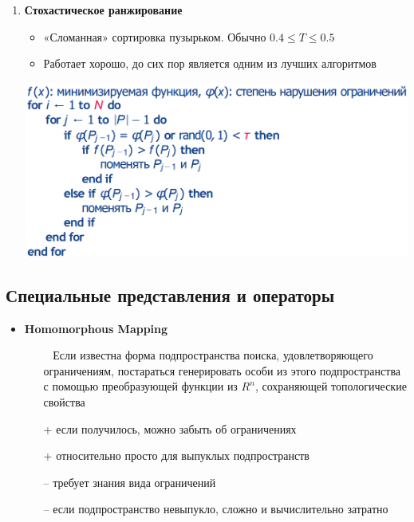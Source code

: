 \begin{enumerate}
\begin{itemize}
    \end{itemize}

    \item \textbf{Стохастическое ранжирование}
    \begin{itemize}
        \item «Сломанная» сортировка пузырьком. Обычно $0.4 \leq T \leq 0.5$
        \item Работает хорошо, до сих пор является одним из лучших алгоритмов
    \end{itemize}
    \includegraphics[scale=0.5]{formula_min_func}

\end{enumerate}

\subsection{Специальные представления и операторы}
\begin{itemize}
    \item \textbf{Homomorphous Mapping}
    \begin{itemize}
        \item [~] Если известна форма подпространства поиска, удовлетворяющего ограничениям, постараться генерировать особи из этого подпространства с помощью преобразующей функции из $R^n$, сохраняющей топологические свойства
        \item [+] если получилось, можно забыть об ограничениях
        \item [+] относительно просто для выпуклых подпространств
        \item [--] требует знания вида ограничений
        \item [--] если подпространство невыпукло, сложно и вычислительно затратно

    \end{itemize}
\end{itemize}

